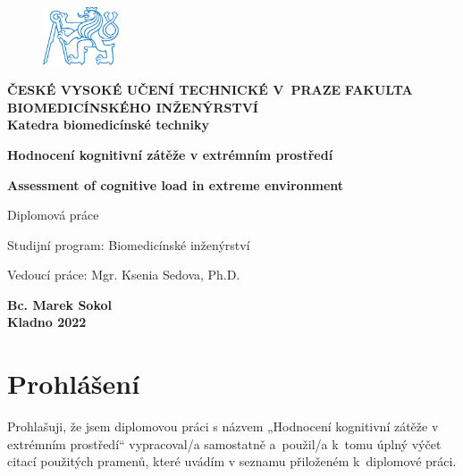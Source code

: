 \documentclass[a4paper,12pt,czech,oneside]{memoir}
\def\uv#1{„#1“}
\numberwithin{equation}{chapter}
\newcommand{\autor}{Bc. Marek Sokol}
\newcommand{\vedouci}{Mgr. Ksenia Sedova, Ph.D.}
\newcommand{\nazev}{Hodnocení kognitivní zátěže v extrémním prostředí}
\newcommand{\nazevENG}{Assessment of cognitive load in extreme environment}
\newcommand{\typ}{Diplomová práce}
\newcommand{\rok}{2022}
\newcommand{\program}{Biomedicínské inženýrství}
\newcommand{\fakulta}{FAKULTA BIOMEDICÍNSKÉHO INŽENÝRSTVÍ}
\newcommand{\cvut}{ČESKÉ VYSOKÉ UČENÍ TECHNICKÉ V~PRAZE}
\newcommand{\katedra}{Katedra biomedicínské techniky}
\begin{document}
\pagestyle{empty}
\begin{titlingpage}
	\begin{center}
		\begin{figure}[!h]
			\centering
			\includegraphics[width=0.2\textwidth]{symbol_cvut_konturova_verze}
		\end{figure}
		\textsf{\large{\textbf{\cvut}}}
		{\color{NavyBlue}\makebox[\linewidth]{\rule[.2\baselineskip]{\textwidth}{0.4mm}}}
		\textsf{\normalsize{\textbf{\fakulta}}}\\

		\textsf{\textbf{\katedra}}

		\vfill

		\textsf{\Large{\textbf{\nazev}}}

		\vspace{36pt}

		\textsf{\Large{\textbf{\nazevENG}}}

		\vspace{48pt}

		\textsf{\typ}

		\vfill

	\end{center}
	\textsf{Studijní program: \program}

	\vspace{12pt}

	\noindent\textsf{Vedoucí práce: \vedouci}

	\vspace{24pt}

	\begin{center}
		\textsf{\textbf{\autor}} \\ [0.5cm]
		{\color{NavyBlue}\makebox[\linewidth]{\rule{\textwidth}{0.4mm}}}
		\textsf{\textbf{Kladno \rok}}
	\end{center}
\end{titlingpage}

% 

\null\vfill
\section*{Prohlášení}
Prohlašuji, že jsem diplomovou práci s názvem \uv{\nazev} vypracoval/a
samostatně a~použil/a k~tomu úplný výčet citací použitých pramenů, které uvádím
v seznamu přiloženém k~diplomové práci.
\end{document}
